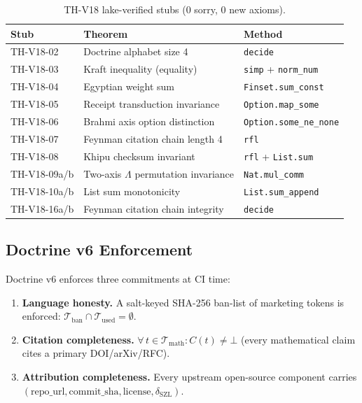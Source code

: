 \documentclass[11pt,letterpaper]{article}
\theoremstyle{definition}
\theoremstyle{remark}
\begin{document}
\begin{table}[ht]
\centering\small
\caption{TH-V18 lake-verified stubs (0 sorry, 0 new axioms).}
\label{tab:th-stubs}
\renewcommand{\arraystretch}{1.2}
\begin{tabular}{lll}
\toprule
\textbf{Stub} & \textbf{Theorem} & \textbf{Method} \\
\midrule
TH-V18-02 & Doctrine alphabet size 4 & \texttt{decide} \\
TH-V18-03 & Kraft inequality (equality) & \texttt{simp} + \texttt{norm\_num} \\
TH-V18-04 & Egyptian weight sum & \texttt{Finset.sum\_const} \\
TH-V18-05 & Receipt transduction invariance & \texttt{Option.map\_some} \\
TH-V18-06 & Brahmi axis option distinction & \texttt{Option.some\_ne\_none} \\
TH-V18-07 & Feynman citation chain length 4 & \texttt{rfl} \\
TH-V18-08 & Khipu checksum invariant & \texttt{rfl} + \texttt{List.sum} \\
TH-V18-09a/b & Two-axis $\Lambda$ permutation invariance & \texttt{Nat.mul\_comm} \\
TH-V18-10a/b & List sum monotonicity & \texttt{List.sum\_append} \\
TH-V18-16a/b & Feynman citation chain integrity & \texttt{decide} \\
\bottomrule
\end{tabular}
\end{table}

\subsection{Doctrine v6 Enforcement}

Doctrine v6 enforces three commitments at CI time:
\begin{enumerate}\setlength{\itemsep}{0pt}
  \item \textbf{Language honesty.} A salt-keyed SHA-256 ban-list of
    marketing tokens is enforced: \(\mathcal{T}_{\mathrm{ban}} \cap
    \mathcal{T}_{\mathrm{used}} = \emptyset\).
  \item \textbf{Citation completeness.}
    \(\forall\, t \in \mathcal{T}_{\mathrm{math}} : C(t) \neq \bot\)
    (every mathematical claim cites a primary DOI/arXiv/RFC).
  \item \textbf{Attribution completeness.} Every upstream open-source
    component carries \((\text{repo\_url}, \text{commit\_sha},
    \text{license}, \delta_{\mathrm{SZL}})\).
\end{enumerate}
\end{document}
